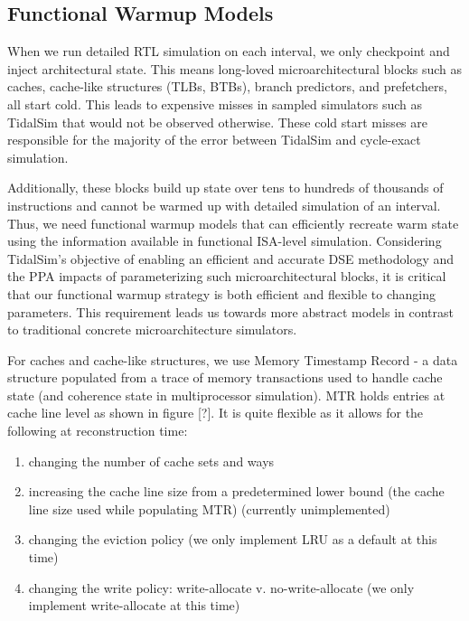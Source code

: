 \documentclass[sigplan,nonacm,10pt]{acmart}
\begin{document}
\subsection{Functional Warmup Models}




When we run detailed RTL simulation on each interval, we only checkpoint and inject architectural state. This means long-loved microarchitectural blocks such as caches, cache-like structures (TLBs, BTBs), branch predictors, and prefetchers, all start cold.
This leads to expensive misses in sampled simulators such as TidalSim that would not be observed otherwise. These cold start misses are responsible for the majority of the error between TidalSim and cycle-exact simulation.

Additionally, these blocks build up state over tens to hundreds of thousands of instructions and cannot be warmed up with detailed simulation of an interval. Thus, we need functional warmup models that can efficiently recreate warm state using the information available in functional ISA-level simulation.
Considering TidalSim's objective of enabling an efficient and accurate DSE methodology and the PPA impacts of parameterizing such microarchitectural blocks, it is critical that our functional warmup strategy is both efficient and flexible to changing parameters. This requirement leads us towards more abstract models in contrast to traditional concrete microarchitecture simulators.

For caches and cache-like structures, we use Memory Timestamp Record \cite{barr2005accelerating} - a data structure populated from a trace of memory transactions used to handle cache state (and coherence state in multiprocessor simulation). MTR holds entries at cache line level as shown in figure [?].
It is quite flexible as it allows for the following at reconstruction time:
\begin{enumerate}
  \item changing the number of cache sets and ways
  \item increasing the cache line size from a predetermined lower bound (the cache line size used while populating MTR) (currently unimplemented)
  \item changing the eviction policy (we only implement LRU as a default at this time)
  \item changing the write policy: write-allocate v. no-write-allocate (we only implement write-allocate at this time)
\end{enumerate}
\end{document}
